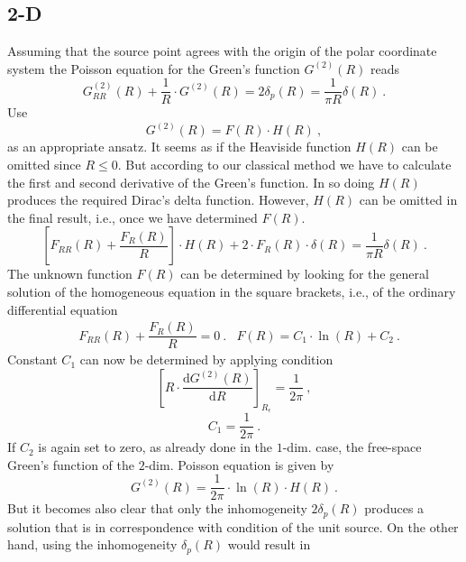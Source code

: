 \documentclass[11pt,a4paper]{article}
\newcommand{\dif}{\mathrm{d}}
\begin{document}
\subsection{2-D}
\cite{Rother:2256622} Assuming that the source point agrees with the origin of the polar coordinate system the Poisson equation for the Green’s function $G^{(2)}(R)$ reads
\begin{equation}
G^{(2)}_{RR}(R) +\dfrac{1}{R} \cdot G^{(2)}(R) = 2\delta_p (R) = \dfrac{1}{\pi R} \delta(R) ~.
\end{equation}
Use
\begin{equation}
G^{(2)}(R) = F(R) \cdot H(R) ~,
\end{equation}
as an appropriate ansatz. It seems as if the Heaviside function $H(R)$ can be omitted since $R \leqslant 0$. But according to our classical method we have to calculate the first and second derivative of the Green's function. In so doing $H(R)$ produces the required Dirac's delta function. However, $H(R)$ can be omitted in the final result, i.e., once we have determined $F(R)$. 
\begin{equation}
\left[F_{RR}(R) +\dfrac{F_{R}(R)}{R}  \right] \cdot H(R) + 2\cdot F_R(R) \cdot \delta(R) = \dfrac{1}{\pi R}\delta(R) ~.
\end{equation}
The unknown function $F(R)$ can be determined by looking for the general solution of the homogeneous equation in the square brackets, i.e., of the ordinary differential equation
\begin{align}
& F_{RR}(R) +\dfrac{F_{R}(R)}{R}  = 0 ~.
& F(R) = C_1 \cdot \ln(R) +C_2 ~.
\end{align}
Constant $C_1$ can now be determined by applying condition
\begin{equation}
\left[ R\cdot \dfrac{\dif G^{(2)}(R)}{\dif R} \right]_{R_\epsilon} = \dfrac{1}{2\pi} ~,
\end{equation}
\begin{equation}
C_1 = \dfrac{1}{2\pi} ~.
\end{equation}
If $C_2$ is again set to zero, as already done in the $1$-dim. case, the free-space Green's function of the $2$-dim. Poisson equation is given by
\begin{equation}
G^{(2)}(R) =  \dfrac{1}{2\pi} \cdot \ln (R) \cdot H(R) ~.
\end{equation}
But it becomes also clear that only the inhomogeneity $2 \delta_p(R)$ produces a solution that is in correspondence with condition of the unit source. On the other hand, using the inhomogeneity $\delta_p(R)$ would result in
\end{document}
